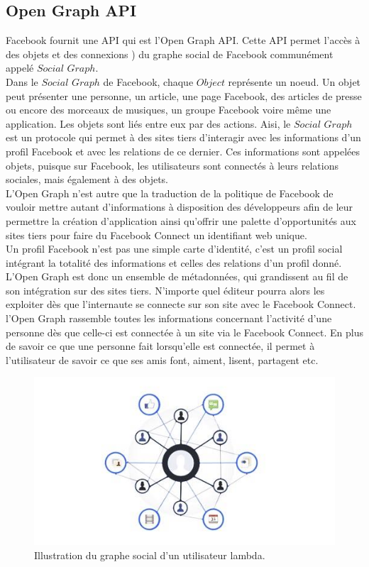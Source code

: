 \subsection{Open Graph API}


Facebook fournit une API qui est l'Open Graph API. Cette API permet l'accès à des objets et des connexions ) du graphe social de Facebook communément appelé $Social$ $Graph$.\\
Dans le $Social$ $Graph$ de Facebook, chaque $Object$ représente un noeud. Un objet peut présenter une personne, un article, une page Facebook, des articles de presse ou encore des morceaux de musiques, un groupe Facebook voire même une application. Les objets sont liés entre eux par des actions.
Aisi, le $Social$ $Graph$ est un protocole qui permet à des sites tiers d'interagir avec les informations d'un profil Facebook et avec les relations de ce dernier. Ces informations sont appelées objets, puisque sur Facebook, les utilisateurs sont connectés à leurs relations sociales, mais également à des objets.\\
L'Open Graph n'est autre que la traduction de la politique de Facebook de vouloir mettre autant d'informations à disposition des développeurs afin de leur permettre la création d'application ainsi qu'offrir une palette d'opportunités aux sites tiers pour faire du Facebook Connect un identifiant web unique.\\
Un profil Facebook n'est pas une simple carte d'identité, c'est un profil social intégrant la totalité des informations et celles des relations d'un profil donné. L'Open Graph est donc un ensemble de métadonnées, qui grandissent au fil de son intégration sur des sites tiers. N'importe quel éditeur pourra alors les exploiter dès que l'internaute se connecte sur son site avec le Facebook Connect.\\
l'Open Graph rassemble toutes les informations concernant l'activité d'une personne dès que celle-ci est connectée à un site via le Facebook Connect. En plus de savoir ce que une personne fait lorsqu'elle est connectée, il permet à l'utilisateur de savoir ce que ses amis font, aiment, lisent, partagent etc.

\begin{figure}[!h]
\begin{center}
\includegraphics[scale=0.6]{social_graph.jpg}
\caption{Illustration du graphe social d'un utilisateur lambda.}
\end{center}
\end{figure}

